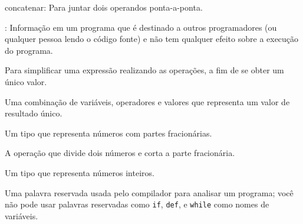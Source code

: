 {{{{{{{{{{{{{{{{{\begin{description}
concatenar: Para juntar dois operandos ponta-a-ponta.

\item[Comentário]: Informação em um programa que é destinado a outros 
programadores (ou qualquer pessoa lendo o código fonte) e não tem qualquer
efeito sobre a execução do programa.

\item[Avaliar:] Para simplificar uma expressão realizando as operações, 
a fim de se obter um único valor.

\item[Expressão:] Uma combinação de variáveis, operadores e valores que representa um
valor de resultado único.

\item[Ponto Flutuante:] Um tipo que representa números com partes 
fracionárias.

\item[Floor Division:] A operação que divide dois números e corta 
a parte fracionária.

\item[Integer:] Um tipo que representa números inteiros.

\item[Palavra Reservada:] Uma palavra reservada usada pelo compilador para analisar um 
programa; você não pode usar palavras reservadas como {\tt if}, {\tt  def}, e {\tt while} como 
nomes de variáveis.


\end{description}}}}}}}}}}}}}}}}}}
